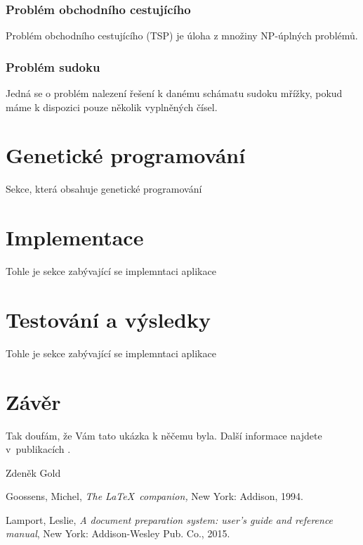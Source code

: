 \documentclass[bc,male,java,dept460]{diploma}		%
\begin{document}
\subsubsection{Problém obchodního cestujícího}
Problém obchodního cestujícího (TSP) je úloha z množiny NP-úplných problémů.

\subsubsection{Problém sudoku}
Jedná se o problém nalezení řešení k danému schámatu sudoku mřížky, pokud máme k dispozici pouze několik vyplněných čísel.


\section{Genetické programování}
Sekce, která obsahuje genetické programování

\section{Implementace}
Tohle je sekce zabývající se implemntaci aplikace

\section{Testování a výsledky}
Tohle je sekce zabývající se implemntaci aplikace

\section{Závěr}
\label{sec:Conclusion}
Tak doufám, že Vám tato ukázka k něčemu byla. Další informace najdete v~publikacích
\cite{goossens94,lamport94}.

\bigskip
\begin{flushright}
Zdeněk Gold
\end{flushright}

\begin{thebibliography}{99}

 Goossens, Michel,
\textit{The \LaTeX\ companion,} New York: Addison, 1994.

 Lamport, Leslie,
\textit{A document preparation system: user's guide and reference manual},
New York: Addison-Wesley Pub. Co., 2015.

\end{thebibliography}
\end{document}
